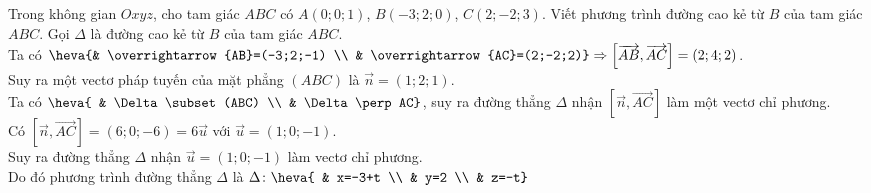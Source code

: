 \TL
\begin{ex}%
Trong không gian $Oxyz$, cho tam giác $ABC$ có $A(0;0;1)$, $B(-3;2;0)$, $C(2;-2;3)$. Viết phương trình đường cao kẻ từ $B$ của tam giác $ABC$.%
\loigiai
{
Gọi $\Delta$ là đường cao kẻ từ $B$ của tam giác $ABC$.\\
Ta có $\heva{& \overrightarrow{AB}=(-3;2;-1) \\ & \overrightarrow{AC}=(2;-2;2)} \Rightarrow \left[\overrightarrow{AB},\overrightarrow{AC}\right]=(2;4;2)$. \\
Suy ra một vectơ pháp tuyến của mặt phẳng $(ABC)$ là $\overrightarrow{n}=(1;2;1)$.\\
Ta có $\heva{ & \Delta \subset(ABC) \\ & \Delta \perp AC}$, suy ra đường thẳng $\Delta$ nhận $\left[\overrightarrow{n},\overrightarrow{AC}\right]$ làm một vectơ chỉ phương.\\
Có $\left[\overrightarrow{n},\overrightarrow{AC}\right]=(6;0;-6)=6\overrightarrow{u}$ với $\overrightarrow{u}=(1;0;-1)$. \\
Suy ra đường thẳng $\Delta$ nhận $\overrightarrow{u}=(1;0;-1)$ làm vectơ chỉ phương.\\
Do đó phương trình đường thẳng $\Delta$ là $\Delta \colon \heva{ & x=-3+t \\ & y=2 \\ & z=-t} $%
}
\end{ex}

